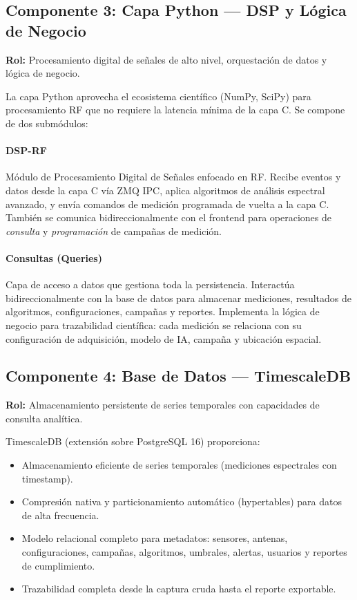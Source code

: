 \documentclass[12pt,a4paper]{article}
\begin{document}
\subsection{Componente 3: Capa Python --- DSP y Lógica de Negocio}

\textbf{Rol:} Procesamiento digital de señales de alto nivel, orquestación de datos y lógica de negocio.

La capa Python aprovecha el ecosistema científico (NumPy, SciPy) para procesamiento RF que no requiere la latencia mínima de la capa C. Se compone de dos submódulos:

\paragraph{DSP-RF}
Módulo de Procesamiento Digital de Señales enfocado en RF. Recibe eventos y datos desde la capa C vía ZMQ IPC, aplica algoritmos de análisis espectral avanzado, y envía comandos de medición programada de vuelta a la capa C. También se comunica bidireccionalmente con el frontend para operaciones de \textit{consulta} y \textit{programación} de campañas de medición.

\paragraph{Consultas (Queries)}
Capa de acceso a datos que gestiona toda la persistencia. Interactúa bidireccionalmente con la base de datos para almacenar mediciones, resultados de algoritmos, configuraciones, campañas y reportes. Implementa la lógica de negocio para trazabilidad científica: cada medición se relaciona con su configuración de adquisición, modelo de IA, campaña y ubicación espacial.

\subsection{Componente 4: Base de Datos --- TimescaleDB}

\textbf{Rol:} Almacenamiento persistente de series temporales con capacidades de consulta analítica.

TimescaleDB (extensión sobre PostgreSQL 16) proporciona:
\begin{itemize}
  \item Almacenamiento eficiente de series temporales (mediciones espectrales con timestamp).
  \item Compresión nativa y particionamiento automático (hypertables) para datos de alta frecuencia.
  \item Modelo relacional completo para metadatos: sensores, antenas, configuraciones, campañas, algoritmos, umbrales, alertas, usuarios y reportes de cumplimiento.
  \item Trazabilidad completa desde la captura cruda hasta el reporte exportable.
\end{itemize}
\end{document}
